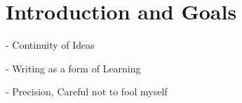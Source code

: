 \chapter{Introduction and Goals} 


- Continuity of Ideas

- Writing as a form of Learning

- Precision, Careful not to fool myself
